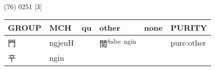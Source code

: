 \documentclass[14pt,a4paper]{scrartcl}
\begin{document}
(76) 0251 {[}3{]}

\begin{longtable}[c]{@{}llllll@{}}
\toprule
\begin{minipage}[b]{0.14\columnwidth}\raggedright\strut
GROUP
\strut\end{minipage} &
\begin{minipage}[b]{0.14\columnwidth}\raggedright\strut
MCH
\strut\end{minipage} &
\begin{minipage}[b]{0.14\columnwidth}\raggedright\strut
qu
\strut\end{minipage} &
\begin{minipage}[b]{0.14\columnwidth}\raggedright\strut
other
\strut\end{minipage} &
\begin{minipage}[b]{0.14\columnwidth}\raggedright\strut
none
\strut\end{minipage} &
\begin{minipage}[b]{0.14\columnwidth}\raggedright\strut
PURITY
\strut\end{minipage}\tabularnewline
\midrule
\endhead
\begin{minipage}[t]{0.14\columnwidth}\raggedright\strut
門
\strut\end{minipage} &
\begin{minipage}[t]{0.14\columnwidth}\raggedright\strut
ngjenH
\strut\end{minipage} &
\begin{minipage}[t]{0.14\columnwidth}\raggedright\strut
\strut\end{minipage} &
\begin{minipage}[t]{0.14\columnwidth}\raggedright\strut
誾\textsuperscript{8abe~ngin}
\strut\end{minipage} &
\begin{minipage}[t]{0.14\columnwidth}\raggedright\strut
\strut\end{minipage} &
\begin{minipage}[t]{0.14\columnwidth}\raggedright\strut
pure:other
\strut\end{minipage}\tabularnewline
\begin{minipage}[t]{0.14\columnwidth}\raggedright\strut
䇂
\strut\end{minipage} &
\begin{minipage}[t]{0.14\columnwidth}\raggedright\strut
ngin
\strut\end{minipage} &
\begin{minipage}[t]{0.14\columnwidth}\raggedright\strut
\strut\end{minipage} &

\end{longtable}
\end{document}
